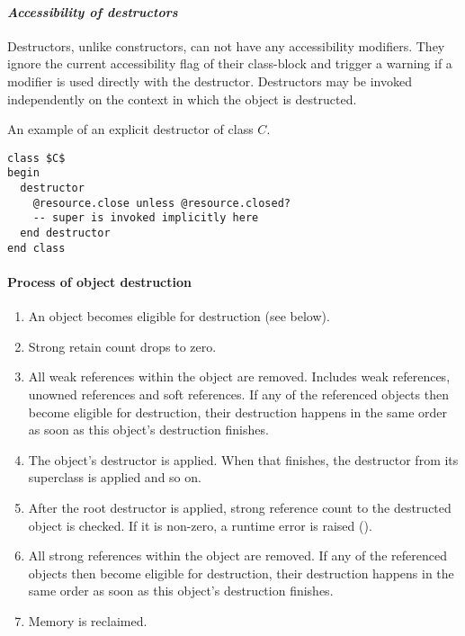 \paragraph{\em Accessibility of destructors}
Destructors, unlike constructors, can not have any accessibility modifiers. They ignore the current accessibility flag of their class-block and trigger a warning if a modifier is used directly with the destructor. Destructors may be invoked independently on the context in which the object is destructed. 

\example An example of an explicit destructor of class $C$. 
\begin{lstlisting}
class $C$
begin
  destructor
    @resource.close unless @resource.closed?
    -- super is invoked implicitly here
  end destructor
end class
\end{lstlisting}

\paragraph{Process of object destruction}

\begin{enumerate}
  \item An object becomes eligible for destruction (see below). 
  \item Strong retain count drops to zero. 
  \item All weak references within the object are removed. Includes weak references, unowned references and soft references. If any of the referenced objects then become eligible for destruction, their destruction happens in the same order as soon as this object's destruction finishes. 
  \item The object's destructor is applied. When that finishes, the destructor from its superclass is applied and so on. 
  \item After the root destructor is applied, strong reference count to the destructed object is checked. If it is non-zero, a runtime error is raised ().
  \item All strong references within the object are removed. If any of the referenced objects then become eligible for destruction, their destruction happens in the same order as soon as this object's destruction finishes. 
  \item Memory is reclaimed. 
\end{enumerate}

